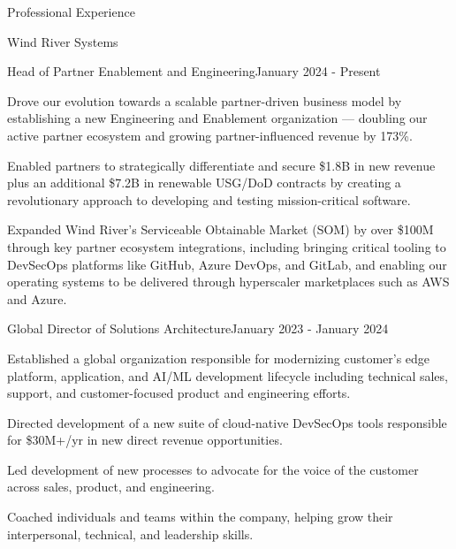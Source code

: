 \documentclass{resume} %
\begin{document}
\begin{rSection}{Professional Experience}
  
  \begin{rCompany}{Wind River Systems}{}{}

    \begin{rSubSubsection}{Head of Partner Enablement and Engineering}{}{January 2024 - Present}
      \item Drove our evolution towards a scalable partner-driven business model by establishing a new Engineering and Enablement organization --- doubling our active partner ecosystem and growing partner-influenced revenue by 173\%.
      \item Enabled partners to strategically differentiate and secure \$1.8B in new revenue plus an additional \$7.2B in renewable USG/DoD contracts by creating a revolutionary approach to developing and testing mission-critical software.
      \item Expanded Wind River's Serviceable Obtainable Market (SOM) by over \$100M through key partner ecosystem integrations, including bringing critical tooling to DevSecOps platforms like GitHub, Azure DevOps, and GitLab, and enabling our operating systems to be delivered through hyperscaler marketplaces such as AWS and Azure.

    \end{rSubSubsection}
    
    \begin{rSubSubsection}{Global Director of Solutions Architecture}{}{January 2023 - January 2024}
      \item Established a global organization responsible for modernizing customer's edge platform, application, and AI/ML development lifecycle including technical sales, support, and customer-focused product and engineering efforts.
      \item Directed development of a new suite of cloud-native DevSecOps tools responsible for \$30M+/yr in new direct revenue opportunities.
      \item Led development of new processes to advocate for the voice of the customer across sales, product, and engineering.
      \item Coached individuals and teams within the company, helping grow their interpersonal, technical, and leadership skills.
    \end{rSubSubsection}
  \end{rCompany}


\end{rSection}
\end{document}
